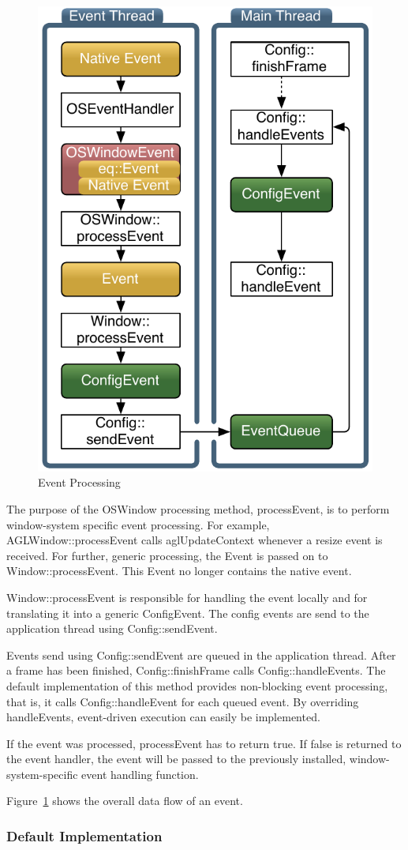 \documentclass[10pt,a4]{scrartcl}
\newcommand{\fig}[1]{Figure~\ref{#1}}
\begin{document}
\begin{figure}
  \includegraphics[width=.382\textwidth]{images/eventFilter.pdf}
  {\caption{\label{fEventProcessing}Event Processing}}
\end{figure}
The purpose of the \textsf{OSWindow} processing method,
\textsf{processEvent}, is to perform window-system specific event
processing. For example, \textsf{AGLWindow::processEvent} calls
\textsf{aglUpdateContext} whenever a resize event is received. For
further, generic processing, the \textsf{Event} is passed on to
\textsf{Window::processEvent}. This \textsf{Event} no longer contains
the native event.

\textsf{Window::processEvent} is responsible for handling
the event locally and for translating it into a generic
\textsf{ConfigEvent}. The config events are send to the application
thread using \textsf{Config::sendEvent}. 

Events send using \textsf{Config::sendEvent} are queued in the
application thread. After a frame has been finished,
\textsf{Config::finishFrame} calls \textsf{Config::handleEvents}. The
default implementation of this method provides non-blocking event
processing, that is, it calls \textsf{Config::handleEvent} for each
queued event. By overriding \textsf{handleEvents}, event-driven
execution can easily be implemented.

If the event was processed, \textsf{processEvent} has to return
\textsf{true}. If \textsf{false} is returned to the event handler, the
event will be passed to the previously installed, window-system-specific
event handling function.

\fig{fEventProcessing} shows the overall data flow of an event.

\subsubsection{Default Implementation}
\end{document}

